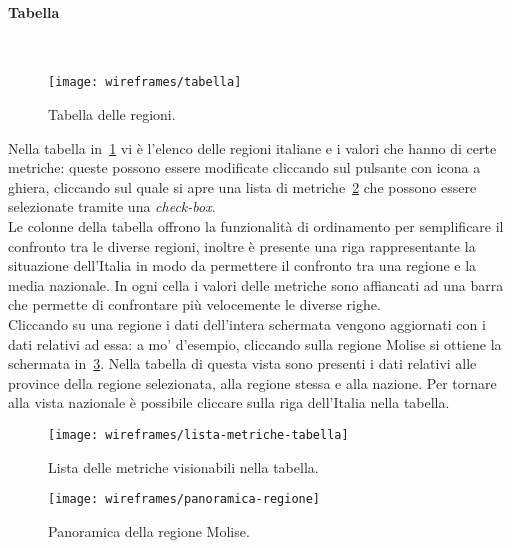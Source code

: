 \documentclass[../../../main.tex]{subfiles}
\begin{document}
\paragraph{Tabella}\mbox{}\\
\begin{figure}[H]
    \centering
    \texttt{[image: wireframes/tabella]}
    \caption{Tabella delle regioni.}
    \label{fig:tabella}
\end{figure}
Nella tabella in~\ref{fig:tabella} vi è l'elenco delle regioni italiane e i valori che hanno di certe metriche: queste possono essere modificate cliccando sul pulsante con icona a ghiera, cliccando sul quale si apre una lista di metriche~\ref{fig:lista-metriche-tabella} che possono essere selezionate tramite una \textit{check-box}.\\
Le colonne della tabella offrono la funzionalità di ordinamento per semplificare il confronto tra le diverse regioni, inoltre è presente una riga rappresentante la situazione dell'Italia in modo da permettere il confronto tra una regione e la media nazionale. In ogni cella i valori delle metriche sono affiancati ad una barra che permette di confrontare più velocemente le diverse righe.\\
Cliccando su una regione i dati dell'intera schermata vengono aggiornati con i dati relativi ad essa: a mo' d'esempio, cliccando sulla regione Molise si ottiene la schermata in~\ref{fig:panoramica-regione}. Nella tabella di questa vista sono presenti i dati relativi alle province della regione selezionata, alla regione stessa e alla nazione. Per tornare alla vista nazionale è possibile cliccare sulla riga dell'Italia nella tabella.
\begin{figure}[H]
    \centering
    \texttt{[image: wireframes/lista-metriche-tabella]}
    \caption{Lista delle metriche visionabili nella tabella.}
    \label{fig:lista-metriche-tabella}
\end{figure}

\begin{figure}[H]
    \centering
    \texttt{[image: wireframes/panoramica-regione]}
    \caption{Panoramica della regione Molise.}
    \label{fig:panoramica-regione}
\end{figure}
\clearpage
\end{document}
